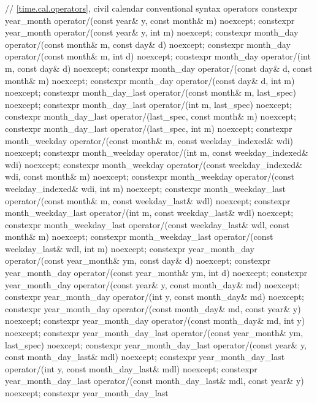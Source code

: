 \begin{codeblock}
{{    // \ref{time.cal.operators}, civil calendar conventional syntax operators
    constexpr year_month
      operator/(const year& y, const month& m) noexcept;
    constexpr year_month
      operator/(const year& y, int m) noexcept;
    constexpr month_day
      operator/(const month& m, const day& d) noexcept;
    constexpr month_day
      operator/(const month& m, int d) noexcept;
    constexpr month_day
      operator/(int m, const day& d) noexcept;
    constexpr month_day
      operator/(const day& d, const month& m) noexcept;
    constexpr month_day
      operator/(const day& d, int m) noexcept;
    constexpr month_day_last
      operator/(const month& m, last_spec) noexcept;
    constexpr month_day_last
      operator/(int m, last_spec) noexcept;
    constexpr month_day_last
      operator/(last_spec, const month& m) noexcept;
    constexpr month_day_last
      operator/(last_spec, int m) noexcept;
    constexpr month_weekday
      operator/(const month& m, const weekday_indexed& wdi) noexcept;
    constexpr month_weekday
      operator/(int m, const weekday_indexed& wdi) noexcept;
    constexpr month_weekday
      operator/(const weekday_indexed& wdi, const month& m) noexcept;
    constexpr month_weekday
      operator/(const weekday_indexed& wdi, int m) noexcept;
    constexpr month_weekday_last
      operator/(const month& m, const weekday_last& wdl) noexcept;
    constexpr month_weekday_last
      operator/(int m, const weekday_last& wdl) noexcept;
    constexpr month_weekday_last
      operator/(const weekday_last& wdl, const month& m) noexcept;
    constexpr month_weekday_last
      operator/(const weekday_last& wdl, int m) noexcept;
    constexpr year_month_day
      operator/(const year_month& ym, const day& d) noexcept;
    constexpr year_month_day
      operator/(const year_month& ym, int d) noexcept;
    constexpr year_month_day
      operator/(const year& y, const month_day& md) noexcept;
    constexpr year_month_day
      operator/(int y, const month_day& md) noexcept;
    constexpr year_month_day
      operator/(const month_day& md, const year& y) noexcept;
    constexpr year_month_day
      operator/(const month_day& md, int y) noexcept;
    constexpr year_month_day_last
      operator/(const year_month& ym, last_spec) noexcept;
    constexpr year_month_day_last
      operator/(const year& y, const month_day_last& mdl) noexcept;
    constexpr year_month_day_last
      operator/(int y, const month_day_last& mdl) noexcept;
    constexpr year_month_day_last
      operator/(const month_day_last& mdl, const year& y) noexcept;
    constexpr year_month_day_last
}}
\end{codeblock}
